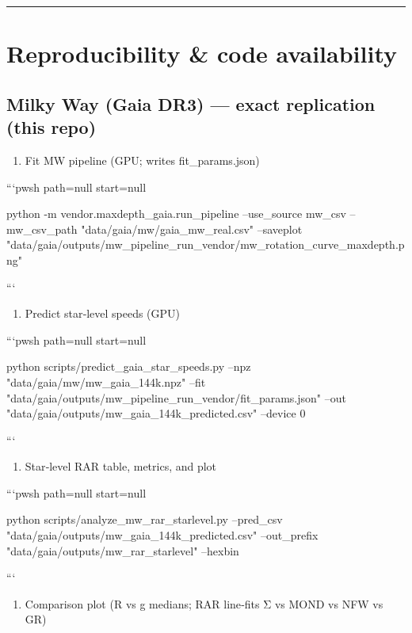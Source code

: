 \documentclass[11pt,a4paper]{article}
\begin{document}
\medskip\hrule\medskip


\section{Reproducibility \& code availability}


\subsection{Milky Way (Gaia DR3) — exact replication (this repo)}


\begin{enumerate}
\item Fit MW pipeline (GPU; writes fit\_params.json)
\end{enumerate}

```pwsh path=null start=null

python -m vendor.maxdepth\_gaia.run\_pipeline --use\_source mw\_csv --mw\_csv\_path "data/gaia/mw/gaia\_mw\_real.csv" --saveplot "data/gaia/outputs/mw\_pipeline\_run\_vendor/mw\_rotation\_curve\_maxdepth.png"

```


\begin{enumerate}
\item Predict star‑level speeds (GPU)
\end{enumerate}

```pwsh path=null start=null

python scripts/predict\_gaia\_star\_speeds.py --npz "data/gaia/mw/mw\_gaia\_144k.npz" --fit "data/gaia/outputs/mw\_pipeline\_run\_vendor/fit\_params.json" --out "data/gaia/outputs/mw\_gaia\_144k\_predicted.csv" --device 0

```


\begin{enumerate}
\item Star‑level RAR table, metrics, and plot
\end{enumerate}

```pwsh path=null start=null

python scripts/analyze\_mw\_rar\_starlevel.py --pred\_csv "data/gaia/outputs/mw\_gaia\_144k\_predicted.csv" --out\_prefix "data/gaia/outputs/mw\_rar\_starlevel" --hexbin

```


\begin{enumerate}
\item Comparison plot (R vs g medians; RAR line‑fits Σ vs MOND vs NFW vs GR)
\end{enumerate}
\end{document}
